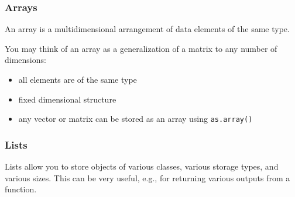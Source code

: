 \documentclass[
  11pt,
]{article}
\newenvironment{Shaded}{\begin{snugshade}}{\end{snugshade}}
\newcommand{\AttributeTok}[1]{\textcolor[rgb]{0.77,0.63,0.00}{#1}}
\newcommand{\DecValTok}[1]{\textcolor[rgb]{0.00,0.00,0.81}{#1}}
\newcommand{\FunctionTok}[1]{\textcolor[rgb]{0.00,0.00,0.00}{#1}}
\newcommand{\NormalTok}[1]{#1}
\newcommand{\OtherTok}[1]{\textcolor[rgb]{0.56,0.35,0.01}{#1}}
\newcommand{\SpecialCharTok}[1]{\textcolor[rgb]{0.00,0.00,0.00}{#1}}
\providecommand{\tightlist}{%
  \setlength{\itemsep}{0pt}\setlength{\parskip}{0pt}}
\begin{document}
\hypertarget{arrays}{%
\subsubsection{Arrays}\label{arrays}}

An array is a multidimensional arrangement of data elements of the same type.

You may think of an array as a generalization of a matrix to any number of dimensions:

\begin{itemize}
\tightlist
\item
  all elements are of the same type
\item
  fixed dimensional structure
\item
  any vector or matrix can be stored as an array using \texttt{as.array()}
\end{itemize}

\hypertarget{lists}{%
\subsubsection{Lists}\label{lists}}

Lists allow you to store objects of various classes, various storage types, and various sizes.
This can be very useful, e.g., for returning various outputs from a function.

\begin{Shaded}
\end{Shaded}
\end{document}
